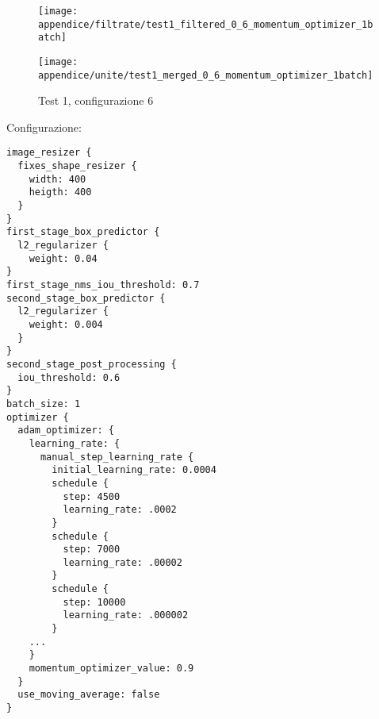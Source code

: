\newpage
\begin{figure}[H]  
    \begin{minipage}{.5\columnwidth}  
        \centering  
        \texttt{[image: appendice/filtrate/test1\_filtered\_0\_6\_momentum\_optimizer\_1batch]}  
    \end{minipage}%
    \begin{minipage}{0.5\columnwidth}  
        \centering  
        \texttt{[image: appendice/unite/test1\_merged\_0\_6\_momentum\_optimizer\_1batch]}  
    \end{minipage}  
    \caption{Test 1, configurazione 6}
\end{figure}%
Configurazione:
\begin{multicols}{2}
    \begin{lstlisting}
image_resizer {
  fixes_shape_resizer {
    width: 400
    heigth: 400
  }
}
first_stage_box_predictor {
  l2_regularizer {
    weight: 0.04
}
first_stage_nms_iou_threshold: 0.7
second_stage_box_predictor {
  l2_regularizer {
    weight: 0.004
  }
}
second_stage_post_processing {
  iou_threshold: 0.6
}
batch_size: 1
optimizer {
  adam_optimizer: {
    learning_rate: {
      manual_step_learning_rate {
        initial_learning_rate: 0.0004
        schedule {
          step: 4500
          learning_rate: .0002
        }
        schedule {
          step: 7000
          learning_rate: .00002
        }
        schedule {
          step: 10000
          learning_rate: .000002
        }
    ...
    }
    momentum_optimizer_value: 0.9
  }
  use_moving_average: false
}
    \end{lstlisting}
\end{multicols}
